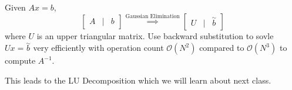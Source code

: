 \documentclass[12pt]{scrartcl}
\begin{document}
\begin{definition}
  Given $Ax = b$, 
  \[\begin{bmatrix}
    A & | & b
  \end{bmatrix} \overset{\text{Gaussian Elimination}}{\implies} \begin{bmatrix}
    U & | & \overset{\sim}{b}
  \end{bmatrix}\]
  where $U$ is an upper triangular matrix. Use backward substitution to sovle $Ux = \overset{\sim}{b}$
  very efficiently with operation count $\mathcal{O}(N^2)$ compared to $\mathcal{O}(N^3)$ to 
  compute $A^{-1}$.  
\end{definition}

\begin{note}
  This leads to the LU Decomposition which we will learn about next class. 
\end{note}
\end{document}
